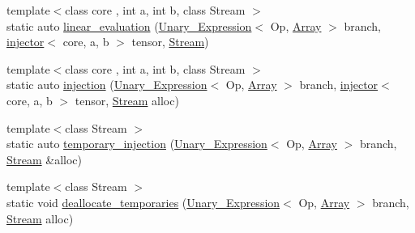 \begin{DoxyCompactItemize}
\item 
{\footnotesize template$<$class core , int a, int b, class Stream $>$ }\\static auto \hyperlink{structBC_1_1tensors_1_1exprs_1_1optimizer_3_01Unary__Expression_3_01Op_00_01Array_01_4_01_4_a815117ee2cbf615ce5759a0bb8036de7}{linear\+\_\+evaluation} (\hyperlink{structBC_1_1tensors_1_1exprs_1_1Unary__Expression}{Unary\+\_\+\+Expression}$<$ Op, \hyperlink{classBC_1_1tensors_1_1exprs_1_1Array}{Array} $>$ branch, \hyperlink{structBC_1_1tensors_1_1exprs_1_1injector}{injector}$<$ core, a, b $>$ tensor, \hyperlink{namespaceBC_abc64a63cd29a22d102a68f478dfd588d}{Stream})
\item 
{\footnotesize template$<$class core , int a, int b, class Stream $>$ }\\static auto \hyperlink{structBC_1_1tensors_1_1exprs_1_1optimizer_3_01Unary__Expression_3_01Op_00_01Array_01_4_01_4_ad5a45644a6e9f4aa04cb0ae0a044de30}{injection} (\hyperlink{structBC_1_1tensors_1_1exprs_1_1Unary__Expression}{Unary\+\_\+\+Expression}$<$ Op, \hyperlink{classBC_1_1tensors_1_1exprs_1_1Array}{Array} $>$ branch, \hyperlink{structBC_1_1tensors_1_1exprs_1_1injector}{injector}$<$ core, a, b $>$ tensor, \hyperlink{namespaceBC_abc64a63cd29a22d102a68f478dfd588d}{Stream} alloc)
\item 
{\footnotesize template$<$class Stream $>$ }\\static auto \hyperlink{structBC_1_1tensors_1_1exprs_1_1optimizer_3_01Unary__Expression_3_01Op_00_01Array_01_4_01_4_a753b437d3710746f8c1c4249fa89ed02}{temporary\+\_\+injection} (\hyperlink{structBC_1_1tensors_1_1exprs_1_1Unary__Expression}{Unary\+\_\+\+Expression}$<$ Op, \hyperlink{classBC_1_1tensors_1_1exprs_1_1Array}{Array} $>$ branch, \hyperlink{namespaceBC_abc64a63cd29a22d102a68f478dfd588d}{Stream} \&alloc)
\item 
{\footnotesize template$<$class Stream $>$ }\\static void \hyperlink{structBC_1_1tensors_1_1exprs_1_1optimizer_3_01Unary__Expression_3_01Op_00_01Array_01_4_01_4_ad67031589c174f552199abbf2ff13651}{deallocate\+\_\+temporaries} (\hyperlink{structBC_1_1tensors_1_1exprs_1_1Unary__Expression}{Unary\+\_\+\+Expression}$<$ Op, \hyperlink{classBC_1_1tensors_1_1exprs_1_1Array}{Array} $>$ branch, \hyperlink{namespaceBC_abc64a63cd29a22d102a68f478dfd588d}{Stream} alloc)
\end{DoxyCompactItemize}
